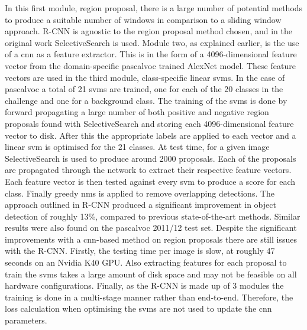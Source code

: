 In this first module, region proposal, there is a large number of potential methods to produce a suitable number of windows in comparison to a sliding window approach. R-CNN is agnostic to the region proposal method chosen, and in the original work SelectiveSearch \cite{selectivesearch} is used. Module two, as explained earlier, is the use of a \gls{cnn} as a feature extractor. This is in the form of a 4096-dimensional feature vector from the domain-specific \gls{pascalvoc} trained AlexNet model. These feature vectors are used in the third module, class-specific linear \glspl{svm}. In the case of \gls{pascalvoc} a total of 21 \glspl{svm} are trained, one for each of the 20 classes in the challenge and one for a background class. The training of the \glspl{svm} is done by forward propagating a large number of both positive and negative region proposals found with SelectiveSearch and storing each 4096-dimensional feature vector to disk. After this the appropriate labels are applied to each vector and a linear \gls{svm} is optimised for the 21 classes. At test time, for a given image SelectiveSearch is used to produce around 2000 proposals. Each of the proposals are propagated through the network to extract their respective feature vectors. Each feature vector is then tested against every \gls{svm} to produce a score for each class. Finally greedy \gls{nms} is applied to remove overlapping detections. The approach outlined in R-CNN produced a significant improvement in object detection of roughly 13\%, compared to previous state-of-the-art methods. Similar results were also found on the \gls{pascalvoc} 2011/12 test set. Despite the significant improvements with a \gls{cnn}-based method on region proposals there are still issues with the R-CNN. Firstly, the testing time per image is slow, at roughly 47 seconds on an Nvidia K40 GPU. Also extracting features for each proposal to train the \glspl{svm} takes a large amount of disk space and may not be feasible on all hardware configurations. Finally, as the R-CNN is made up of 3 modules the training is done in a multi-stage manner rather than end-to-end. Therefore, the loss calculation when optimising the \glspl{svm} are not used to update the \gls{cnn} parameters.
\\\\
